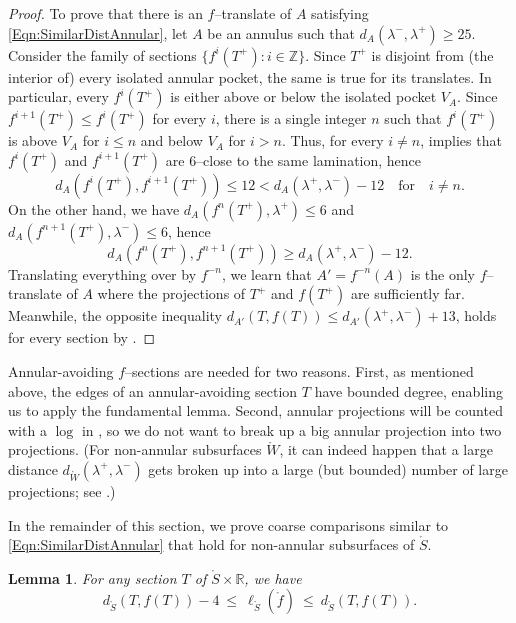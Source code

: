 \documentclass[11pt,letterpaper]{amsart}
\newcommand{\RR}[0]{\mathbb{R}}
\newcommand{\ZZ}[0]{\mathbb{Z}}
\newcommand{\mr}{\mathring}
\newcommand{\psub}{\mr W}
\numberwithin{equation}{section}
\newtheorem{lemma}[theorem]{Lemma}
\theoremstyle{definition}
\begin{document}
\begin{proof}
To prove that there is an $f$--translate of $A$ satisfying \eqref{Eqn:SimilarDistAnnular}, let $A$ be an annulus such that $d_A(\lambda^-, \lambda^+) \geq 25$. Consider the family of sections $\{ f^i(T^+): i \in \ZZ \}$. Since $T^+$ is disjoint from (the interior of) every isolated annular pocket, the same is true for its translates. In particular, every $ f^i(T^+)$ is either above or below the isolated pocket $V_A$. Since $f^{i+1}(T^+) \leq f^i(T^+)$ for every $i$, there is a single integer $n$ such that $ f^i(T^+)$ is above $V_A$ for $i \leq n$ and below $V_A$ for $i > n$. Thus, for every $i \neq n$,  implies
that $ f^i(T^+)$ and $f^{i+1}(T^+)$ are $6$--close to the same lamination, hence
\[
d_A(f^i(T^+), f^{i+1}(T^+)) \leq 12 <  d_{A}(\lambda^+,\lambda^-) - 12
\quad \text{for} \quad i \neq n.
\]
On the other hand, we have $d_A(f^n(T^+), \lambda^+) \leq 6$ and $d_A(f^{n+1}(T^+), \lambda^-) \leq 6$, hence
\[
d_A(f^n(T^+), f^{n+1}(T^+)) \geq  d_{A}(\lambda^+,\lambda^-) - 12.
\]
Translating everything over by $f^{-n}$, we learn that $A' = f^{-n}(A)$ is the only $f$--translate of $A$ where the projections of $T^+$ and $f(T^+)$ are sufficiently far. Meanwhile, the opposite inequality $ d_{A'}(T, f(T)) \leq d_{A'}(\lambda^+,\lambda^-) +13$, holds for every section by .
\end{proof}

Annular-avoiding $f$--sections are needed for two reasons. First, as mentioned above, the edges of an annular-avoiding section $T$
 have bounded degree, enabling us to apply the fundamental lemma. Second, annular projections will be counted with a $\log$ in , so we do not want to break up a big annular projection into two projections. (For non-annular subsurfaces $\psub$, it can indeed happen that a large distance $d_{\psub}(\lambda^+, \lambda^-)$ gets broken up into a large (but bounded) number of large projections; see .)

In the remainder of this section, we prove coarse comparisons similar to \eqref{Eqn:SimilarDistAnnular} that hold for non-annular subsurfaces of $\mr S$.


\begin{lemma}\label{Lem:SectionsAlongGeodesic}
 For any section $T$ of $\mr S \times \RR$, we have
 \[
 d_{\mr S}(T, f(T)) - 4 \: \leq \: \ell_{\mr S}(\mr f) \: \leq \: d_{\mr S}(T, f(T)).
 \]
\end{lemma}
\end{document}
